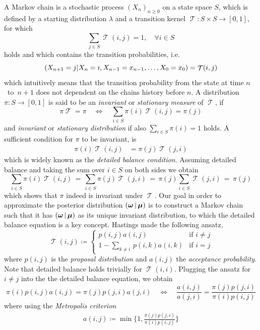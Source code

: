 \documentclass[10pt]{article}
\newcommand{\ie}{i.e.~}
\let\Pr\relax
\DeclareMathOperator\Pr{\mathbb{P}}
\DeclareMathOperator\tk{\mathcal{T}}
\DeclareMathOperator\bmu{\boldsymbol{\mu}}
\DeclareMathOperator\bomega{\boldsymbol{\omega}}
\begin{document}
A Markov chain is a stochastic process $(X_n)_{n \geq 0}$ on a state space $S$, which is defined by a starting 
distribution $\lambda$ and a transition kernel $\tk: S \times S \to [0, 1]$, for which
\[
    \sum_{j \in S} \tk(i,j) = 1, \quad \forall i \in S
\]
holds and which contains the transition probabilities, \ie
\[
    \Pr(X_{n+1} = j | X_{n} = i, X_{n-1} = x_{n-1}, \dots, X_0 = x_0) = \tk(i,j)
\]
which intuitively means that the transition probability from the state at time $n$~to~${n+1}$ does
not dependent on the chains history before $n$.
A distribution $\pi: S \to [0,1]$ is said to be an \emph{invariant} or \emph{stationary measure} 
of $\tk$, if 
\[
    \pi \tk = \pi \quad \Leftrightarrow \quad \sum_{i \in S} \pi(i)\tk(i,j) = \pi(j) %
\]
and \emph{invariant} or \emph{stationary distribution} if also 
$\sum_{i \in S} \pi(i) = 1$ holds.
A sufficient condition for $\pi$ to be invariant, is 
\begin{align}
    \pi(i) \tk(i,j) &= \pi(j) \tk(j,i) \label{eq:detailed-balance} 
\end{align}
which is widely known as the \emph{detailed balance condition}.
Assuming detailed balance and taking the sum over $i \in S$ on both sides we obtain
\[
    \sum_{i \in S} \pi(i) \tk(i,j) \, = \, \sum_{i \in S} \pi(j) \tk(j,i) \, = \, \pi(j) \sum_{i \in S} \tk(j,i) \, = \, \pi(j)
\]
which shows that $\pi$ indeed is invariant under $\tk$.
Our goal in order to approximate the posterior distribution $\Pr(\bomega|\bmu)$ is to construct 
a Markov chain such that it has $\Pr(\bomega|\bmu)$ as its unique invariant distribution, 
to which the detailed balance equation is a key concept.
Hastings \cite{hastings70} made the following ansatz, 
\[
    \tk(i,j) \coloneqq \begin{cases}
	p(i,j)a(i,j) & \text{if } i \neq j \\[3mm]
	1 - \sum\limits_{k \neq i} \, p(i,k)a(i,k) & \text{if } i = j
    \end{cases}
\]
where $p(i,j)$ is the \emph{proposal distribution} and $a(i,j)$ the \emph{acceptance probability}.
Note that detailed balance holds trivially for $\tk(i,i)$.
Plugging the ansatz for $i\neq j$ into the the detailed balance equation, we obtain
\[
    \pi(i)p(i,j)a(i,j) = \pi(j)p(j,i)a(j,i) \quad \iff \quad \frac{a(i,j)}{a(j,i)} = \frac{\pi(j)p(j,i)}{\pi(i)p(i,j)}
\]
where using the \emph{Metropolis criterion} 
\begin{align}
    a(i,j) \coloneqq \min\bigg\{ 1, \frac{\pi(j)p(j,i)}{\pi(i)p(i,j)} \bigg\} 
    \label{eq:metropolis}
\end{align}
\end{document}
